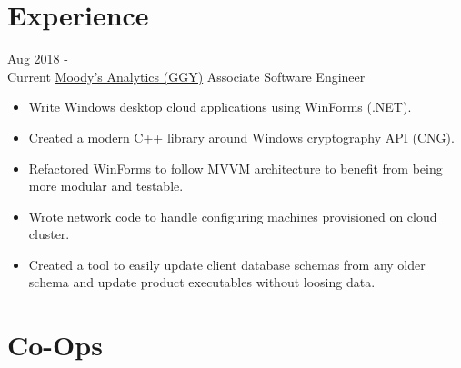 \documentclass[letterpaper]{twentysecondcv} %
\begin{document}
\makeprofile %


\section{Experience}

\begin{twenty} %
		\twentyitem
    	{Aug 2018 -\\Current}
        {\href{https://www.ggy.com/}{Moody's Analytics (GGY)}}
        {Associate Software Engineer}
        {}
        {
        {\begin{itemize}
        \item Write Windows desktop cloud applications using WinForms (.NET).
        \item Created a modern C++ library around Windows cryptography API (CNG).
        \item Refactored WinForms to follow MVVM architecture to benefit from being more modular and testable.
        \item Wrote network code to handle configuring machines provisioned on cloud cluster.
        \item Created a tool to easily update client database schemas from any older schema and update product executables without loosing data.
    \end{itemize}}
        }
\end{twenty}

\section{Co-Ops}
\end{document}
